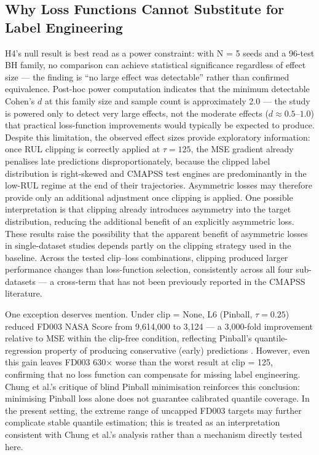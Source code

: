 \documentclass[review,12pt]{elsarticle}
\begin{document}
\subsection{Why Loss Functions Cannot Substitute for Label Engineering}

H4's null result is best read as a power constraint: with N = 5 seeds and a 96-test BH family, no comparison can achieve statistical significance regardless of effect size --- the finding is ``no large effect was detectable'' rather than confirmed equivalence. Post-hoc power computation indicates that the minimum detectable Cohen's $d$ at this family size and sample count is approximately 2.0 --- the study is powered only to detect very large effects, not the moderate effects ($d \approx 0.5$--$1.0$) that practical loss-function improvements would typically be expected to produce. Despite this limitation, the observed effect sizes provide exploratory information: once RUL clipping is correctly applied at $\tau = 125$, the MSE gradient already penalises late predictions disproportionately, because the clipped label distribution is right-skewed and CMAPSS test engines are predominantly in the low-RUL regime at the end of their trajectories. Asymmetric losses may therefore provide only an additional adjustment once clipping is applied. One possible interpretation is that clipping already introduces asymmetry into the target distribution, reducing the additional benefit of an explicitly asymmetric loss. These results raise the possibility that the apparent benefit of asymmetric losses in single-dataset studies \cite{ref37,ref38,ref39} depends partly on the clipping strategy used in the baseline. Across the tested clip--loss combinations, clipping produced larger performance changes than loss-function selection, consistently across all four sub-datasets --- a cross-term that has not been previously reported in the CMAPSS literature.

One exception deserves mention. Under clip = None, L6 (Pinball, $\tau = 0.25$) reduced FD003 NASA Score from 9,614,000 to 3,124 — a 3,000-fold improvement relative to MSE within the clip-free condition, reflecting Pinball's quantile-regression property of producing conservative (early) predictions \cite{ref40}. However, even this gain leaves FD003 630× worse than the worst result at clip = 125, confirming that no loss function can compensate for missing label engineering. Chung et al.'s \cite{ref41} critique of blind Pinball minimisation reinforces this conclusion: minimising Pinball loss alone does not guarantee calibrated quantile coverage. In the present setting, the extreme range of uncapped FD003 targets may further complicate stable quantile estimation; this is treated as an interpretation consistent with Chung et al.'s analysis rather than a mechanism directly tested here.
\end{document}
